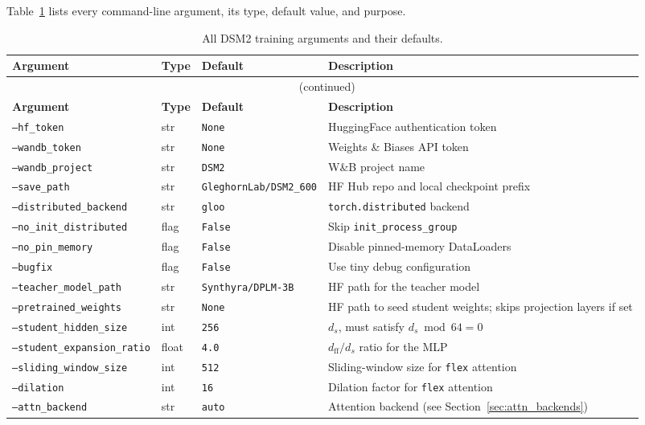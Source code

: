 \documentclass[11pt,a4paper]{article}
\begin{document}
Table~\ref{tab:hparams} lists every command-line argument, its type, default value, and purpose.

\begin{longtable}{p{5.2cm} p{1.3cm} p{3.2cm} p{5.0cm}}
\caption{All DSM2 training arguments and their defaults.\label{tab:hparams}} \\
\toprule
\textbf{Argument} & \textbf{Type} & \textbf{Default} & \textbf{Description} \\
\midrule
\endfirsthead
\multicolumn{4}{c}{\tablename~\thetable{} (continued)} \\
\toprule
\textbf{Argument} & \textbf{Type} & \textbf{Default} & \textbf{Description} \\
\midrule
\endhead
\bottomrule
\endfoot
\bottomrule
\endlastfoot

\texttt{--hf\_token} & str & \texttt{None} & HuggingFace authentication token \\
\texttt{--wandb\_token} & str & \texttt{None} & Weights \& Biases API token \\
\texttt{--wandb\_project} & str & \texttt{DSM2} & W\&B project name \\
\texttt{--save\_path} & str & \texttt{GleghornLab/DSM2\_600} & HF Hub repo and local checkpoint prefix \\
\texttt{--distributed\_backend} & str & \texttt{gloo} & \texttt{torch.distributed} backend \\
\texttt{--no\_init\_distributed} & flag & \texttt{False} & Skip \texttt{init\_process\_group} \\
\texttt{--no\_pin\_memory} & flag & \texttt{False} & Disable pinned-memory DataLoaders \\
\texttt{--bugfix} & flag & \texttt{False} & Use tiny debug configuration \\
\midrule

\texttt{--teacher\_model\_path} & str & \texttt{Synthyra/DPLM-3B} & HF path for the teacher model \\
\texttt{--pretrained\_weights} & str & \texttt{None} & HF path to seed student weights; skips projection layers if set \\
\texttt{--student\_hidden\_size} & int & \texttt{256} & $d_s$, must satisfy $d_s \bmod 64 = 0$ \\
\texttt{--student\_expansion\_ratio} & float & \texttt{4.0} & $d_{\mathrm{ff}} / d_s$ ratio for the MLP \\
\texttt{--sliding\_window\_size} & int & \texttt{512} & Sliding-window size for \texttt{flex} attention \\
\texttt{--dilation} & int & \texttt{16} & Dilation factor for \texttt{flex} attention \\
\texttt{--attn\_backend} & str & \texttt{auto} & Attention backend (see Section~\ref{sec:attn_backends}) \\
\midrule


\end{longtable}
\end{document}
